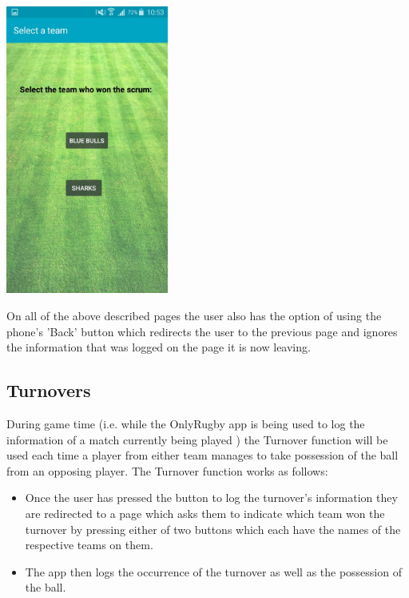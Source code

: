 \documentclass[hidelinks,a4paper,12pt]{article}
\begin{document}
		\begin{center}
  			 \includegraphics[width=0.4\textwidth] {./images/choose_scrum_team.jpg}\\[0.4cm]
		\end{center}

	On all of the above described pages the user also has the option of using the phone's  'Back' button which redirects the user to the previous page and ignores the information that was logged on the page it is now leaving.

\newpage

	\subsection{ Turnovers}
		During game time (i.e. while the OnlyRugby app is being used to log the information of a match currently being played ) the Turnover function will be used each time a player from either team manages to take possession of the ball from an opposing player. The Turnover function works as follows:
		\begin{itemize}
			\item Once the user has pressed the button to log the turnover's information they are redirected to a page which asks them to indicate which team won the turnover by pressing either of two buttons which each have the names of the respective teams on them.
			\item The app then logs the occurrence of the turnover as well as the possession of the ball.
		\end{itemize}
\end{document}
